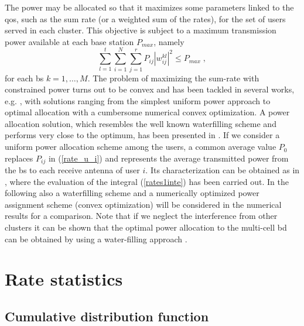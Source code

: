 The power may be allocated so that it maximizes some parameters linked to the \gls{qos}, such as the sum rate (or a weighted sum of the rates), for the set of users served in each cluster. This objective is subject to a maximum transmission power available at each base station $P_{max}$, namely
\begin{equation}
	\sum_{l=1}^{t} \sum_{i=1}^{N}\sum_{j=1}^{r} P_{ij} \left|w_{ij}^{kl}\right|^2 \leq P_{max}\;,
 \label{constraints}
\end{equation}
for each \gls{bs} $k=1,\ldots,M$. The problem of maximizing the sum-rate with constrained power turns out to be convex and has been tackled in several works, e.g. \cite{armada11b},\cite{shim08} with solutions ranging from the simplest uniform power approach to optimal allocation with a cumbersome numerical convex optimization. A power allocation solution, which resembles the well known waterfilling scheme and performs very close to the optimum, has been presented in \cite{armada11b}. If we consider a uniform power allocation scheme among the users, a common average value $P_{0}$ replaces $P_{ij}$ in (\ref{rate_u_i}) and represents the average transmitted power from the \gls{bs} to each receive antenna of user $i$. Its characterization can be obtained as in \cite{corvaja13b}, where the evaluation of the integral (\ref{rates1inte}) has been carried out.
In the following also a waterfilling scheme \cite{armada11b} and a numerically optimized power assignment scheme (convex optimization) will be considered in the numerical results for a comparison. Note that if we neglect the interference from other clusters it can be shown that the optimal power allocation to the multi-cell \gls{bd} can be obtained by using a water-filling approach \cite{zhang10b}.


\section{Rate statistics}

\subsection{Cumulative distribution function}

